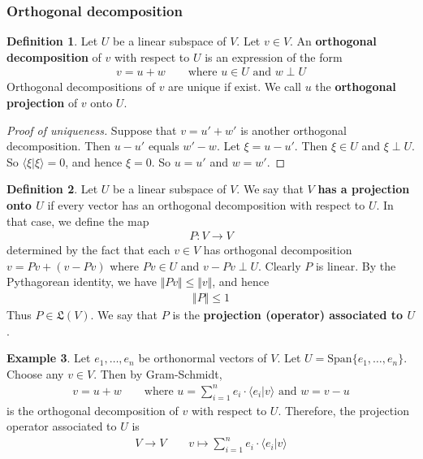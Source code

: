 \documentclass[12pt,b5paper,notitlepage]{article}
\theoremstyle{definition}
\newtheorem{df}{Definition}[section]
\newtheorem{eg}[df]{Example}
\theoremstyle{plain}
\newcommand{\fk}{\mathfrak}
\newcommand{\Span}{\mathrm{Span}}
\newcommand{\bk}[1]{\langle {#1}\rangle}
\numberwithin{equation}{section}
\begin{document}
\subsubsection{Orthogonal decomposition}


\begin{df}\label{lb119}
Let $U$ be a linear subspace of $V$. Let $v\in V$. An \textbf{orthogonal decomposition}  of $v$ with respect to $U$ is an expression of the form
\begin{align*}
v=u+w\qquad \text{where $u\in U$ and $w\perp U$}
\end{align*}
Orthogonal decompositions of $v$ are unique if exist. We call $u$ the \textbf{orthogonal projection} of $v$ onto $U$.
\end{df}

\begin{proof}[Proof of uniqueness]
Suppose that $v=u'+w'$ is another orthogonal decomposition. Then $u-u'$ equals $w'-w$. Let $\xi=u-u'$. Then $\xi\in U$ and $\xi\perp U$. So $\bk{\xi|\xi}=0$, and hence $\xi=0$. So $u=u'$ and $w=w'$.
\end{proof}


\begin{df}
Let $U$ be a linear subspace of $V$. We say that $V$ \textbf{has a projection onto $U$}  if every vector has an orthogonal decomposition with respect to $U$. In that case, we define the map
\begin{align*}
P:V\rightarrow V
\end{align*}
determined by the fact that each $v\in V$ has orthogonal decomposition $v=Pv+(v-Pv)$ where $Pv\in U$ and $v-Pv\perp U$. Clearly $P$ is linear. By the Pythagorean identity, we have $\Vert Pv\Vert\leq\Vert v\Vert$, and hence 
\begin{align*}
\Vert P\Vert\leq 1
\end{align*} 
Thus $P\in\fk L(V)$. We say that $P$ is the \textbf{projection (operator) associated to $U$}. 
\end{df}


\begin{eg}\label{lb124}
Let $e_1,\dots,e_n$ be orthonormal vectors of $V$. Let $U=\Span\{e_1,\dots,e_n\}$. Choose any $v\in V$. Then by Gram-Schmidt,
\begin{align}
v=u+w\qquad\text{where }u=\sum_{i=1}^ne_i\cdot\bk{e_i|v}\text{ and }w=v-u
\end{align}
is the orthogonal decomposition of $v$ with respect to $U$. Therefore, the projection operator associated to $U$ is 
\begin{align*}
V\rightarrow V\qquad v\mapsto\sum_{i=1}^n e_i\cdot\bk{e_i|v}
\end{align*}
\end{eg}
\end{document}
